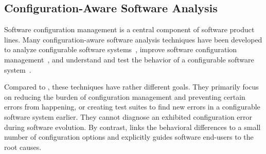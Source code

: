 \subsection{Configuration-Aware Software Analysis}

Software configuration management is a central component
of software product lines.
Many configuration-aware software analysis techniques
have been developed to analyze configurable software
systems~\cite{Bodden:2013:SLS, Kang:2005:FRL, Mende:2008:SGM,
Kruger:2005:SAE}, improve software configuration
management~\cite{Garvin:2011, Rabiser:2012:QSU, Cooray:2010:RRD,
Barreiros:2009:MRC, TerBeek:2011:GCE}, and understand and test
the behavior of a configurable software
system~\cite{Siegmund:2012:PPV, Qu:2008:CRT, SPLAT, Apel:2009:FLA, Shang:2013:ADB,
Staats:2011:PTO}.

Compared to \ourtool, these techniques have rather different
goals. They primarily focus on reducing the burden of
configuration management and preventing certain errors from
happening, or creating test suites to find new errors in
a configurable software system earlier. They cannot
diagnose an exhibited configuration error during software evolution.
By contrast, \ourtool 
links the behavioral differences to a small number
of configuration options and explicitly guides software end-users
to the root causes.






